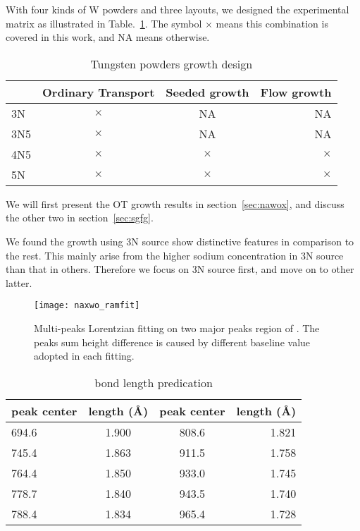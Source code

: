 With four kinds of W powders and three layouts, we designed the experimental matrix as illustrated in Table.~\ref{tab:matrix}. The symbol $\times$ means this combination is covered in this work, and NA means otherwise.
\begin{table}[htb]
\centering
\caption{Tungsten powders growth design}\label{tab:matrix}
\begin{tabular}{lccr}
\toprule
 & Ordinary Transport & Seeded growth & Flow growth \\
\midrule
3N   &  $\times$ & NA &  NA   \\
3N5  &  $\times$ & NA &  NA   \\
4N5  &  $\times$ & $\times$ & $\times$ \\
5N   &  $\times$ & $\times$ &  $\times$ \\
\bottomrule
\end{tabular}
\end{table}

We will first present the OT growth results in section~\ref{sec:nawox}, and discuss the other two in section~\ref{sec:sgfg}.

We found the growth using 3N source show distinctive features in comparison to the rest. This mainly arise from the higher sodium concentration in 3N source than that in others. Therefore we focus on 3N source first, and move on to other latter.


\begin{figure}[htb]
\centering
\texttt{[image: naxwo\_ramfit]}
\caption[ Raman fitting]{Multi-peaks Lorentzian fitting on two major peaks region of . The peaks sum height difference is caused by different baseline value adopted in each fitting.}
\label{fig:naworamfit}
\end{figure}

\begin{table}[htb]
\centering
\caption{ bond length predication}\label{tab:nawobond}
\begin{tabular}{lccr}
\toprule
peak center & length (\AA) & peak center & length (\AA) \\
\midrule
694.6 & 1.900 &  808.6 &  1.821 \\
745.4 & 1.863 &  911.5 &  1.758 \\
764.4 & 1.850 &  933.0 &  1.745 \\
778.7 & 1.840 &   943.5 & 1.740 \\
788.4 & 1.834 &   965.4 & 1.728 \\
\bottomrule
\end{tabular}
\end{table}

